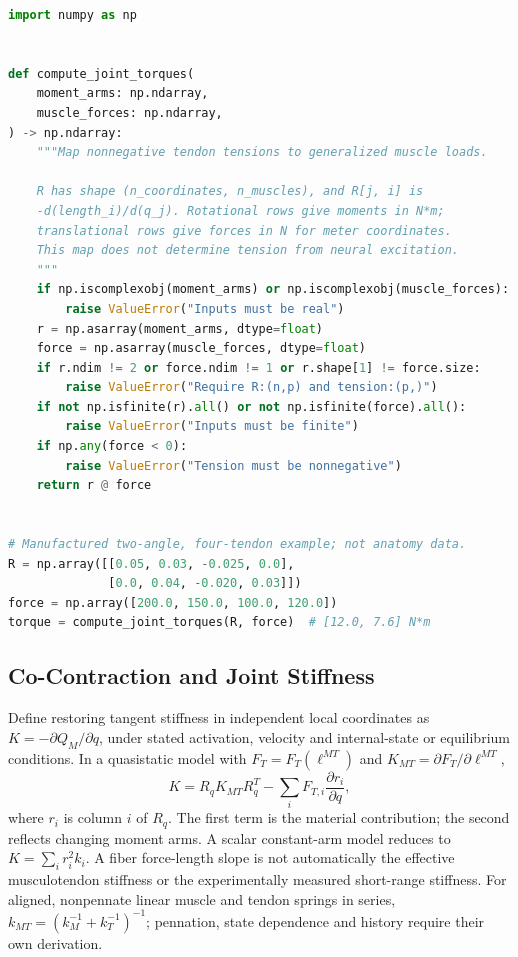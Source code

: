 \begin{lstlisting}[language=Python, caption={Mapping Tendon Tension to Generalized Muscle Loads}]
import numpy as np


def compute_joint_torques(
    moment_arms: np.ndarray,
    muscle_forces: np.ndarray,
) -> np.ndarray:
    """Map nonnegative tendon tensions to generalized muscle loads.

    R has shape (n_coordinates, n_muscles), and R[j, i] is
    -d(length_i)/d(q_j). Rotational rows give moments in N*m;
    translational rows give forces in N for meter coordinates.
    This map does not determine tension from neural excitation.
    """
    if np.iscomplexobj(moment_arms) or np.iscomplexobj(muscle_forces):
        raise ValueError("Inputs must be real")
    r = np.asarray(moment_arms, dtype=float)
    force = np.asarray(muscle_forces, dtype=float)
    if r.ndim != 2 or force.ndim != 1 or r.shape[1] != force.size:
        raise ValueError("Require R:(n,p) and tension:(p,)")
    if not np.isfinite(r).all() or not np.isfinite(force).all():
        raise ValueError("Inputs must be finite")
    if np.any(force < 0):
        raise ValueError("Tension must be nonnegative")
    return r @ force


# Manufactured two-angle, four-tendon example; not anatomy data.
R = np.array([[0.05, 0.03, -0.025, 0.0],
              [0.0, 0.04, -0.020, 0.03]])
force = np.array([200.0, 150.0, 100.0, 120.0])
torque = compute_joint_torques(R, force)  # [12.0, 7.6] N*m
\end{lstlisting}

\subsection{Co-Contraction and Joint Stiffness}

Define restoring tangent stiffness in independent local coordinates as
$K=-\partial Q_M/\partial q$, under stated activation, velocity and internal-state
or equilibrium conditions. In a quasistatic model with
$F_T=F_T(\ell^{MT})$ and $K_{MT}=\partial F_T/\partial\ell^{MT}$,
\begin{equation}
 K=R_qK_{MT}R_q^T-\sum_i F_{T,i}\frac{\partial r_i}{\partial q},
 \label{eq:ch5:joint-stiffness}
\end{equation}
where $r_i$ is column $i$ of $R_q$.
The first term is the material contribution; the second reflects changing
moment arms. A scalar constant-arm model reduces to $K=\sum_i r_i^2k_i$.
A fiber force-length slope is not automatically the effective musculotendon
stiffness or the experimentally measured short-range stiffness.
For aligned, nonpennate linear muscle and tendon springs in series,
$k_{MT}=(k_M^{-1}+k_T^{-1})^{-1}$; pennation, state dependence and history
require their own derivation.

